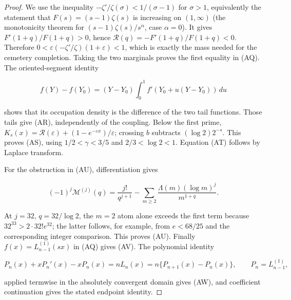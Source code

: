 \documentclass[11pt]{amsart}
\theoremstyle{definition}
\theoremstyle{remark}
\theoremstyle{definition}
\begin{document}
\begin{proof}
We use the inequality
$-\zeta'/\zeta(\sigma)<1/(\sigma-1)$ for $\sigma>1$, equivalently the
statement that $F(s)=(s-1)\zeta(s)$ is increasing on $(1,\infty)$
\cite{AlzerKwong} (the monotonicity theorem for $(s-1)\zeta(s)/s^\alpha$,
case $\alpha=0$).  It gives
$F'(1+q)/F(1+q)>0$, hence
$\mathcal R(q)=-F'(1+q)/F(1+q)<0$.  Therefore
$0<\varepsilon(-\zeta'/\zeta)(1+\varepsilon)<1$, which is
exactly the mass needed for the cemetery completion.  Taking the two
marginals proves the first equality in (AQ).  The oriented-segment identity

\[
 f(Y)-f(Y_0)=(Y-Y_0)\int_0^1
 f'(Y_0+u(Y-Y_0))\,du
\]

shows that its occupation density is the difference of the two tail
functions.  Those tails give (AR), independently of the coupling.  Below
the first prime,
$K_s(x)=\mathcal R(\varepsilon)+(1-e^{-\varepsilon x})/\varepsilon$;
crossing $b$ subtracts $(\log2)2^{-s}$.  This proves (AS), using
$1/2<\gamma<3/5$ and $2/3<\log2<1$.  Equation (AT) follows by Laplace
transform.

For the obstruction in (AU), differentiation gives

\[
 (-1)^j\mathcal M^{(j)}(q)
 =\frac{j!}{q^{j+1}}
  -\sum_{m\ge2}\frac{\Lambda(m)(\log m)^j}{m^{1+q}}.
\]

At $j=32$, $q=32/\log2$, the $m=2$ atom alone exceeds the first
term because $32^{33}>2\cdot32!e^{32}$; the latter follows, for example,
from $e<68/25$ and the corresponding integer comparison.  This proves
(AU).  Finally $f(x)=L_{n-1}^{(1)}(sx)$ in (AQ) gives (AV).  The
polynomial identity

\[
 P_n(x)+xP_n'(x)-xP_n(x)
 =nL_n(x)=n\{P_{n+1}(x)-P_n(x)\},
 \qquad P_n=L_{n-1}^{(1)},
\]

applied termwise in the absolutely convergent domain gives (AW), and
coefficient continuation gives the stated endpoint identity.
\end{proof}
\end{document}
